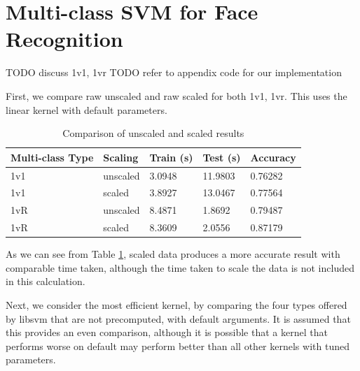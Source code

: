 \documentclass[a4paper, 10pt, conference]{ieeeconf}
\begin{document}


\section{Multi-class SVM for Face Recognition}


TODO discuss 1v1, 1vr
TODO refer to appendix code for our implementation

First, we compare raw unscaled and raw scaled for both 1v1, 1vr. This uses the linear kernel with default parameters.

\begin{table}
\centering
\label{tbl:scaling}
\caption{Comparison of unscaled and scaled results}
\begin{tabular}{lllll}
Multi-class Type & Scaling & Train (s) & Test (s) & Accuracy\\ \hline
1v1 & unscaled & 3.0948 & 11.9803 & 0.76282\\ \hline
1v1 & scaled & 3.8927 & 13.0467 & 0.77564\\ \hline
1vR & unscaled & 8.4871 & 1.8692 & 0.79487\\ \hline
1vR & scaled & 8.3609 & 2.0556 & 0.87179\\ \hline
\end{tabular}
\end{table}

As we can see from Table \ref{tbl:scaling}, scaled data produces a more accurate result with comparable time taken, although the time taken to scale the data is not included in this calculation.

Next, we consider the most efficient kernel, by comparing the four types offered by libsvm that are not precomputed, with default arguments. It is assumed that this provides an even comparison, although it is possible that a kernel that performs worse on default may perform better than all other kernels with tuned parameters.
\end{document}
